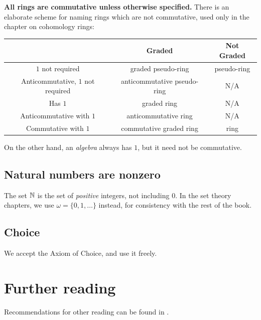 \textbf{All rings are commutative unless otherwise specified.}
There is an elaborate scheme for naming rings which are not commutative,
used only in the chapter on cohomology rings:

\begin{center}
	\small
	\begin{tabular}[h]{|c|cc|}
		\hline
		& Graded & Not Graded \\ \hline
		$1$ not required & graded pseudo-ring & pseudo-ring \\
		Anticommutative, $1$ not required & anticommutative pseudo-ring & N/A \\
		Has $1$ & graded ring & N/A \\
		Anticommutative with $1$ & anticommutative ring & N/A \\ 
		Commutative with $1$ & commutative graded ring & ring \\ \hline
	\end{tabular}
\end{center}

On the other hand, an \emph{algebra} always has $1$,
but it need not be commutative.

\subsection*{Natural numbers are nonzero}
The set $\mathbb N$ is the set of \emph{positive} integers, not including $0$.
In the set theory chapters, we use $\omega = \{0, 1, \dots\}$
instead, for consistency with the rest of the book.

\subsection*{Choice}
We accept the Axiom of Choice, and use it freely.

\section{Further reading}
Recommendations for other reading can be found in .
